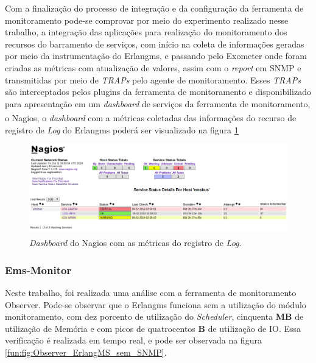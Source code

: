 Com a finalização do processo de integração e da configuração da ferramenta de monitoramento pode-se comprovar por meio do experimento realizado nesse trabalho, a integração das aplicações para realização do monitoramento dos recursos do barramento de serviços, com início na coleta de informações geradas por meio da instrumentação do Erlangms, e passando pelo Exometer onde foram criadas as métricas com atualização de valores, assim com o \textit{report} em \acrshort{SNMP} e transmitidas por meio de \textit{TRAPs} pelo agente de monitoramento. Esses \textit{TRAPs} são interceptados pelos plugins da ferramenta de monitoramento e disponibilizado para apresentação em um \textit{dashboard} de serviços da ferramenta de monitoramento, o Nagios\textsuperscript{\textregistered}, o \textit{dashboard} com a métricas coletadas das informações do recurso de registro de \textit{Log} do Erlangms poderá ser visualizado na figura \ref{fun:fig:nagiosDashbordEmsbus}

\begin{figure}[H]
    \centering
    \includegraphics[scale = 0.57]{img/nagiosConfigurado.png}
    \caption{\textit{Dashboard} do Nagios\textsuperscript{\textregistered} com as métricas do registro de \textit{Log}.}
    \label{fun:fig:nagiosDashbordEmsbus}
\end{figure}

\subsubsection{Ems-Monitor}

Neste trabalho, foi realizada uma análise com a ferramenta de monitoramento Observer. Pode-se observar que o Erlangms funciona sem a utilização do módulo monitoramento, com dez porcento de utilização do \textit{Scheduler}, cinquenta \textbf{MB} de utilização de Memória e com picos de quatrocentos \textbf{B} de utilização de IO. Essa verificação é realizada em tempo real, e pode ser observada na figura \ref{fun:fig:Observer_ErlangMS_sem_SNMP}.

